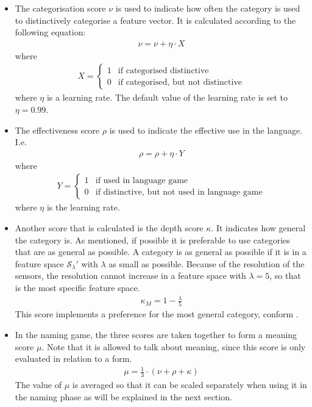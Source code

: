 \begin{itemize}
\item The categorisation score $\nu$ is used to indicate how often the category is used to distinctively categorise a feature vector. It is calculated according to the following equation:
\begin{eqnarray}
\nu = \nu + \eta \cdot X
\label{e:lg:nu}
\end{eqnarray}
where
\begin{eqnarray}
X = \left \{ \begin{array}{rl}
1 & \mbox{if categorised distinctive}\\\nonumber
0 & \mbox{if categorised, but not distinctive}\nonumber
\end{array} \right.
\end{eqnarray}
where $\eta$ is a learning rate. The default value of the learning rate is set to $\eta=0.99$.
 \item The effectiveness score $\rho$ is used to indicate the effective use in the language. I.e.
\begin{eqnarray}
\rho = \rho + \eta \cdot Y
\label{e:lg:rho}
\end{eqnarray}
where
\begin{eqnarray}
Y = \left \{ \begin{array}{rl}
1 & \mbox{if used in language game}\\\nonumber
0 & \mbox{if distinctive, but not used in language game}\nonumber
\end{array} \right.
\end{eqnarray}
where $\eta$ is the learning rate.
\item Another score that is calculated is the depth score $\kappa$. It indicates how general the category is. As mentioned, if possible it is preferable to use categories that are as general as possible. A category is as general as possible if it is in a feature space ${\mathcal S}_\lambda'$ with $\lambda$ as small as possible. Because of the resolution of the sensors, the resolution cannot increase in a feature space with $\lambda=5$, so that is the most specific feature space.
\begin{eqnarray}
\displaystyle
\kappa_M=1 - \frac{\lambda}{5}
\label{e:lg:kappa}
\end{eqnarray}
\noindent
This score implements a preference for the most general category, conform \citep{steels:1996b}. 

\item In the naming game, the three scores are taken together to form a meaning score $\mu$. Note that it is allowed to talk about meaning, since this score is only evaluated in relation to a form.
\begin{eqnarray}
\displaystyle
\mu=\frac{1}{3}\cdot (\nu+\rho+\kappa)
\end{eqnarray}
\noindent
The value of $\mu$ is averaged so that it can be scaled separately when using it in the naming phase as will be explained in the next section.
\end{itemize}


